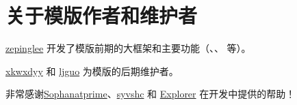 
\section{关于模版作者和维护者}

\href{https://github.com/zepinglee}{zepinglee} 开发了模版前期的大框架和主要功能（、、 等）。

\href{https://github.com/xkwxdyy}{xkwxdyy} 和 \href{https://github.com/ljguo1020}{ljguo} 为模版的后期维护者。

非常感谢\href{https://gitee.com/Sophanatprime}{Sophanatprime}、\href{https://github.com/syvshc}{syvshc} 和 \href{https://gitee.com/chen-yucan}{Explorer} 在开发中提供的帮助！